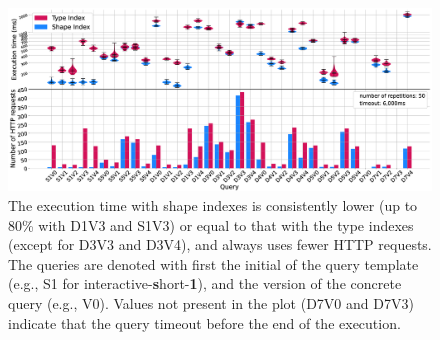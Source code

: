 \begin{figure}
  \centering
  \includegraphics[width=\linewidth]{figure/combined}
  \caption{
  The execution time with shape indexes is consistently lower (up to 80\% with D1V3 and S1V3) or equal to that with the type indexes (except for D3V3 and D3V4), and always uses fewer HTTP requests.
  The queries are denoted with first the initial of the query template (e.g., S1 for interactive-\textbf{s}hort-\textbf{1}), and the version of the concrete query (e.g., V0). 
  Values not present in the plot (D7V0 and D7V3) indicate that the query timeout before the end of the execution.
  }
  \label{fig:result}
\end{figure}